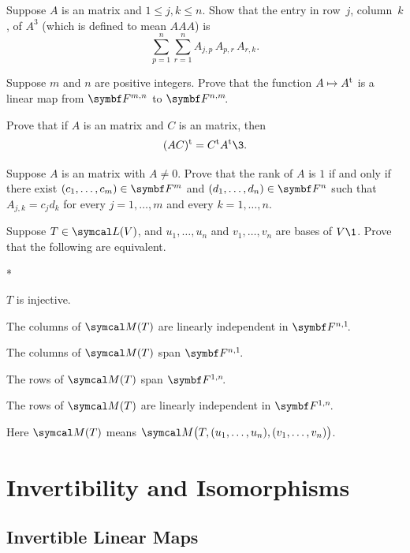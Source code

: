 \begin{exercises}
\exercise
Suppose $A$ is an  matrix and $1 \le j, k \le n$. Show that the entry in row~$j$, column~$k$, of $A^3$ (which is defined to mean $AAA$) is
\[
\sum_{p=1}^n \sum_{r=1}^n A_{j, p} \, A_{p, r} \, A_{r, k}.
\]
\vspace{-10bp}


\exercise
Suppose $m$ and $n$ are positive integers. Prove that the function $A \mapsto A^{\text{t}}$ is a linear map from $\F{m, n}$ to
$\FF{n, m}$.\label{3translinear}


\pagebreak[3]

\exercise
Prove that if $A$ is an  matrix and $C$ is an  matrix, then\label{3tran}
\[
\tran{(AC)} = \tran{C} \tran{A}\3.
\]
\exercisedisplayend
{}


\pagebreak[3]

\exercise
Suppose $A$ is an  matrix with $A \ne 0$. Prove that the rank of $A$ is $1$ if and only if there exist $(c_1, \dots, c_m) \in \F{m}$ and $(d_1, \dots, d_n)\in \F{n}$ such that $A_{j,k} = c_j d_k$ for every $j = 1, \dots, m$ and every $k = 1, \dots, n$.


\exercise
Suppose $T \in \L(V)$, and $u_1, \dots, u_n$ and $v_1, \dots, v_n$ are bases of $V\1$. Prove that the following are equivalent.
\begin{subtheorem}*
\item
$T$ is injective.
\item
The columns of $\M(T)$ are linearly independent in $\FF{n,1}$.
\item
The columns of $\M(T)$ span $\FF{n,1}$.
\item
The rows of $\M(T)$ span $\FF{1,n}$.
\item
The rows of $\M(T)$ are linearly independent in $\FF{1,n}$.
\end{subtheorem}
Here $\M(T)$ means $\M\bigl( T, (u_1, \dots, u_n), (v_1, \dots, v_n) \bigr)$.


\end{exercises}

\section{Invertibility and Isomorphisms} \label{invertible}

\subsection{Invertible Linear Maps}

